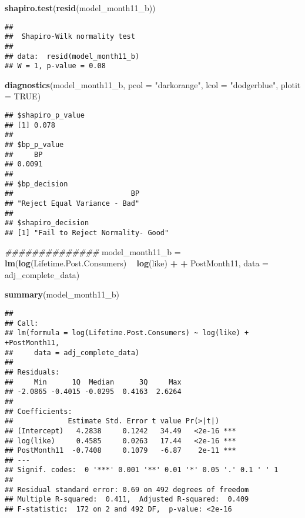 \documentclass[
]{article}
\newenvironment{Shaded}{\begin{snugshade}}{\end{snugshade}}
\newcommand{\CommentTok}[1]{\textcolor[rgb]{0.56,0.35,0.01}{\textit{#1}}}
\newcommand{\DataTypeTok}[1]{\textcolor[rgb]{0.13,0.29,0.53}{#1}}
\newcommand{\KeywordTok}[1]{\textcolor[rgb]{0.13,0.29,0.53}{\textbf{#1}}}
\newcommand{\NormalTok}[1]{#1}
\newcommand{\OperatorTok}[1]{\textcolor[rgb]{0.81,0.36,0.00}{\textbf{#1}}}
\newcommand{\OtherTok}[1]{\textcolor[rgb]{0.56,0.35,0.01}{#1}}
\newcommand{\StringTok}[1]{\textcolor[rgb]{0.31,0.60,0.02}{#1}}
\begin{document}
\begin{Shaded}
\begin{Highlighting}[]
\KeywordTok{shapiro.test}\NormalTok{(}\KeywordTok{resid}\NormalTok{(model_month11_b))}
\end{Highlighting}
\end{Shaded}

\begin{verbatim}
## 
##  Shapiro-Wilk normality test
## 
## data:  resid(model_month11_b)
## W = 1, p-value = 0.08
\end{verbatim}

\begin{Shaded}
\begin{Highlighting}[]
\KeywordTok{diagnostics}\NormalTok{(model_month11_b, }\DataTypeTok{pcol =} \StringTok{"darkorange"}\NormalTok{, }\DataTypeTok{lcol =} \StringTok{"dodgerblue"}\NormalTok{, }\DataTypeTok{plotit =} \OtherTok{TRUE}\NormalTok{)}
\end{Highlighting}
\end{Shaded}

\begin{verbatim}
## $shapiro_p_value
## [1] 0.078
## 
## $bp_p_value
##     BP 
## 0.0091 
## 
## $bp_decision
##                            BP 
## "Reject Equal Variance - Bad" 
## 
## $shapiro_decision
## [1] "Fail to Reject Normality- Good"
\end{verbatim}

\begin{Shaded}
\begin{Highlighting}[]
\CommentTok{##############}
\NormalTok{model_month11_b =}\StringTok{ }\KeywordTok{lm}\NormalTok{(}\KeywordTok{log}\NormalTok{(Lifetime.Post.Consumers) }\OperatorTok{~}\StringTok{   }\KeywordTok{log}\NormalTok{(like) }\OperatorTok{+}\StringTok{  }
\StringTok{                 }\OperatorTok{+}\StringTok{ }\NormalTok{PostMonth11, }\DataTypeTok{data =}\NormalTok{ adj_complete_data)}

\KeywordTok{summary}\NormalTok{(model_month11_b)}
\end{Highlighting}
\end{Shaded}

\begin{verbatim}
## 
## Call:
## lm(formula = log(Lifetime.Post.Consumers) ~ log(like) + +PostMonth11, 
##     data = adj_complete_data)
## 
## Residuals:
##     Min      1Q  Median      3Q     Max 
## -2.0865 -0.4015 -0.0295  0.4163  2.6264 
## 
## Coefficients:
##             Estimate Std. Error t value Pr(>|t|)    
## (Intercept)   4.2838     0.1242   34.49   <2e-16 ***
## log(like)     0.4585     0.0263   17.44   <2e-16 ***
## PostMonth11  -0.7408     0.1079   -6.87    2e-11 ***
## ---
## Signif. codes:  0 '***' 0.001 '**' 0.01 '*' 0.05 '.' 0.1 ' ' 1
## 
## Residual standard error: 0.69 on 492 degrees of freedom
## Multiple R-squared:  0.411,  Adjusted R-squared:  0.409 
## F-statistic:  172 on 2 and 492 DF,  p-value: <2e-16
\end{verbatim}
\end{document}
